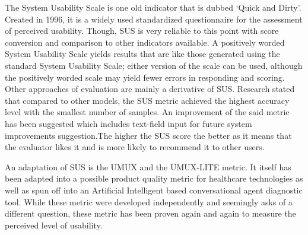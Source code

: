 \documentclass[conference]{IEEEtran}
\begin{document}
The System Usability Scale is one old indicator that is dubbed `Quick and Dirty'\cite{Khalid}. Created in 1996, it is a widely used standardized questionnaire for the assessment of perceived usability\cite{JamesRLewis2018}. Though, SUS is very reliable to this point with score conversion and comparison to other indicators available\cite{Lewis2018MeasuringPU, Lewis2018ItemBF}. A positively worded System Usability Scale yields results that are like those generated using the standard System Usability Scale\cite{Kortum2021IsIT}; either version of the scale can be used, although the positively worded scale may yield fewer errors in responding and scoring\cite{Kortum2021IsIT}. Other approaches of evaluation are mainly a derivative of SUS\@. Research stated that compared to other models, the SUS metric achieved the highest accuracy level with the smallest number of samples\cite{Souza2019UserEE}. An improvement of the said metric has been suggested which includes text-field input for future system improvements suggestion\cite{Harper2021APS}.The higher the SUS score the better as it means that the evaluator likes it and is more likely to recommend it to other users\cite{Gramedia, Drew}.

An adaptation of SUS is the UMUX and the UMUX-LITE metric. It itself has been adapted into a possible product quality metric for healthcare technologies\cite{Borsci2019IsTL} as well as spun off into an Artificial Intelligent based conversational agent diagnostic tool\cite{Borsci2022TheCU}. While these metric were developed independently and seemingly asks of a different question, these metric has been proven again and again to measure the perceived level of usability\cite{Lewis2018MeasuringPU, Berkman2016ReassessingTU, Lewis2019MeasuringPU}.



\end{document}
